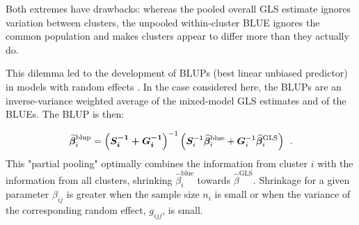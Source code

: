 Both extremes have drawbacks: whereas the pooled overall GLS estimate ignores variation between clusters, 
the unpooled within-cluster BLUE ignores the common population and makes clusters appear to differ more than they actually do.


This dilemma led to the development of BLUPs (best linear unbiased predictor) in models with random effects \citep{Henderson:1975,Robinson:1991,Speed:1991}.
In the case considered here, the BLUPs are an inverse-variance weighted average of the mixed-model GLS estimates and of the BLUEs. The BLUP is then:


\begin{equation}\label{eq:mixed6}
 \widetilde{\bm{\beta}}^{\textrm{blup}}_i =
 \bm{ \left( \bm{\bm{S}_i}^{-1} + \bm{\bm{G}_i}^{-1} \right) }^{-1} 
 \left(
   \bm{\bm{S}}^{-1}_i \widehat{\bm{\beta}}^{\textrm{blue}}_i + 
   \bm{\bm{G}}^{-1}_i \widehat{\bm{\beta}}^{\textrm{GLS}}_i
 \right)
\:\: .
\end{equation}
This "partial pooling" optimally combines the information from cluster $i$ with the information from all clusters, 
shrinking $\widehat{\beta}_i^{\textrm{blue}}$ towards $\widehat{\beta}^{\textrm{GLS}}$. 
Shrinkage for a given parameter $ \beta_{ij} $ is greater when the sample size $n_i$ is small or when the variance of the 
corresponding random effect, $g_{ijj}$, is small. 



